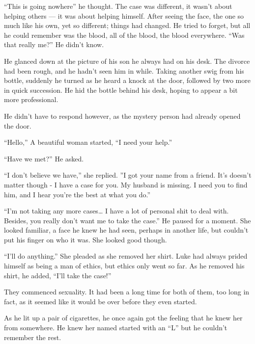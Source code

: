 ``This is going nowhere'' he thought. The case was
different, it wasn't about helping others --- it was
about helping himself. After seeing the face, the one so much like
his own, yet so different; things had changed. He tried to forget,
but all he could remember was the blood, all of the blood, the
blood everywhere. ``Was that really me?'' He didn't
know.



He glanced down at the picture of his son he always had on his
desk. The divorce had been rough, and he hadn't seen him in
while. Taking another swig from his bottle, suddenly he turned as
he heard a knock at the door, followed by two more in quick
succession. He hid the bottle behind his desk, hoping to appear a
bit more professional.



He didn't have to respond however, as the mystery person had
already opened the door.



``Hello,'' A beautiful woman started, ``I need your
help.''



``Have we met?'' He asked.



``I don't believe we have,'' she replied. ''I
got your name from a friend. It's doesn't matter though
- I have a case for you. My husband is missing. I need you to find
him, and I hear you're the best at what you do.''



``I'm not taking any more cases{\ldots} I have a lot of
personal shit to deal with. Besides, you really don't want me
to take the case.'' He paused for a moment. She looked
familiar, a face he knew he had seen, perhaps in another life, but
couldn't put his finger on who it was. She looked good
though.



``I'll do anything.'' She pleaded as she removed
her shirt. Luke had always prided himself as being a man of ethics,
but ethics only went so far. As he removed his shirt, he added,
``I'll take the case!''



They commenced sexuality. It had been a long time for both of them,
too long in fact, as it seemed like it would be over before they
even started.



As he lit up a pair of cigarettes, he once again got the feeling
that he knew her from somewhere. He knew her named started with an
``L'' but he couldn't remember the rest.



